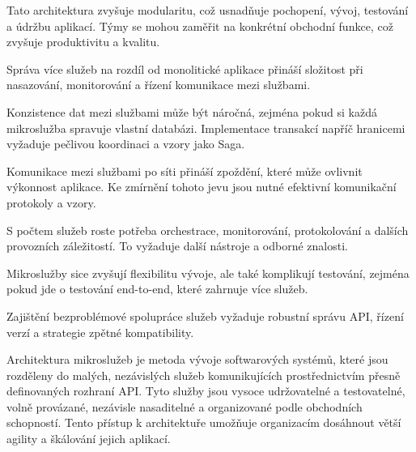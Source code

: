 
Tato architektura zvyšuje modularitu, což usnadňuje pochopení, vývoj, testování a údržbu aplikací. Týmy se mohou zaměřit na konkrétní obchodní funkce, což zvyšuje produktivitu a kvalitu.



Správa více služeb na rozdíl od monolitické aplikace přináší složitost při nasazování, monitorování a řízení komunikace mezi službami.


Konzistence dat mezi službami může být náročná, zejména pokud si každá mikroslužba spravuje vlastní databázi. Implementace transakcí napříč hranicemi vyžaduje pečlivou koordinaci a vzory jako Saga.


Komunikace mezi službami po síti přináší zpoždění, které může ovlivnit výkonnost aplikace. Ke zmírnění tohoto jevu jsou nutné efektivní komunikační protokoly a vzory.


S počtem služeb roste potřeba orchestrace, monitorování, protokolování a dalších provozních záležitostí. To vyžaduje další nástroje a odborné znalosti.


Mikroslužby sice zvyšují flexibilitu vývoje, ale také komplikují testování, zejména pokud jde o testování end-to-end, které zahrnuje více služeb.

 Zajištění bezproblémové spolupráce služeb vyžaduje robustní správu API, řízení verzí a strategie zpětné kompatibility.


Architektura mikroslužeb je metoda vývoje softwarových systémů, které jsou rozděleny do malých, nezávislých služeb komunikujících prostřednictvím přesně definovaných rozhraní API. Tyto služby jsou vysoce udržovatelné a testovatelné, volně provázané, nezávisle nasaditelné a organizované podle obchodních schopností. Tento přístup k architektuře umožňuje organizacím dosáhnout větší agility a škálování jejich aplikací.



